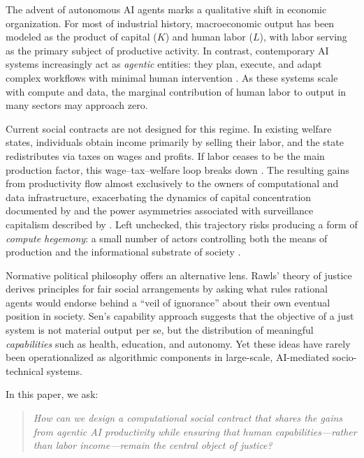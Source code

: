 \documentclass{article}
\begin{document}
The advent of autonomous AI agents marks a qualitative shift in economic organization. For most of industrial history, macroeconomic output has been modeled as the product of capital ($K$) and human labor ($L$), with labor serving as the primary subject of productive activity. In contrast, contemporary AI systems increasingly act as \emph{agentic} entities: they plan, execute, and adapt complex workflows with minimal human intervention \cite{acemoglu2019automation}. As these systems scale with compute and data, the marginal contribution of human labor to output in many sectors may approach zero.

Current social contracts are not designed for this regime. In existing welfare states, individuals obtain income primarily by selling their labor, and the state redistributes via taxes on wages and profits. If labor ceases to be the main production factor, this wage--tax--welfare loop breaks down \cite{gordon2026post}. The resulting gains from productivity flow almost exclusively to the owners of computational and data infrastructure, exacerbating the dynamics of capital concentration documented by \cite{piketty2014capital} and the power asymmetries associated with surveillance capitalism described by \cite{zuboff2019age}. Left unchecked, this trajectory risks producing a form of \emph{compute hegemony}: a small number of actors controlling both the means of production and the informational substrate of society \cite{korinek2019integrating,bostrom2024superintelligence,mckinsey2023generative}.

Normative political philosophy offers an alternative lens. Rawls' theory of justice \cite{rawls1971theory} derives principles for fair social arrangements by asking what rules rational agents would endorse behind a ``veil of ignorance'' about their own eventual position in society. Sen's capability approach \cite{sen1985commodities} suggests that the objective of a just system is not material output per se, but the distribution of meaningful \emph{capabilities} such as health, education, and autonomy. Yet these ideas have rarely been operationalized as algorithmic components in large-scale, AI-mediated socio-technical systems.

In this paper, we ask:

\begin{quote}
\emph{How can we design a computational social contract that shares the gains from agentic AI productivity while ensuring that human capabilities---rather than labor income---remain the central object of justice?}
\end{quote}
\end{document}
